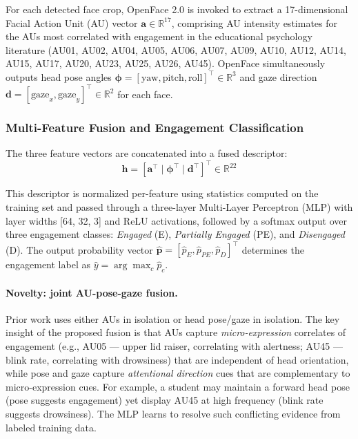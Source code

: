 \documentclass[preprint,12pt]{elsarticle}
\begin{document}
For each detected face crop, OpenFace 2.0 \cite{openface} is invoked to extract a 17-dimensional Facial Action Unit (AU) vector $\mathbf{a} \in \mathbb{R}^{17}$, comprising AU intensity estimates for the AUs most correlated with engagement in the educational psychology literature (AU01, AU02, AU04, AU05, AU06, AU07, AU09, AU10, AU12, AU14, AU15, AU17, AU20, AU23, AU25, AU26, AU45). OpenFace simultaneously outputs head pose angles $\boldsymbol{\phi} = [\text{yaw}, \text{pitch}, \text{roll}]^\top \in \mathbb{R}^3$ and gaze direction $\mathbf{d} = [\text{gaze}_x, \text{gaze}_y]^\top \in \mathbb{R}^2$ for each face.

\subsubsection{Multi-Feature Fusion and Engagement Classification}

The three feature vectors are concatenated into a fused descriptor:
\begin{equation}
\mathbf{h} = \left[\mathbf{a}^\top \;\Big|\; \boldsymbol{\phi}^\top \;\Big|\; \mathbf{d}^\top\right]^\top \in \mathbb{R}^{22}
\label{eq:fusion}
\end{equation}

This descriptor is normalized per-feature using statistics computed on the training set and passed through a three-layer Multi-Layer Perceptron (MLP) with layer widths [64, 32, 3] and ReLU activations, followed by a softmax output over three engagement classes: \textit{Engaged} (E), \textit{Partially Engaged} (PE), and \textit{Disengaged} (D). The output probability vector $\hat{\mathbf{p}} = [\hat{p}_E, \hat{p}_{PE}, \hat{p}_D]^\top$ determines the engagement label as $\hat{y} = \arg\max_c \hat{p}_c$.

\paragraph{Novelty: joint AU-pose-gaze fusion.}
Prior work uses either AUs in isolation or head pose/gaze in isolation. The key insight of the proposed fusion is that AUs capture \textit{micro-expression} correlates of engagement (e.g., AU05 --- upper lid raiser, correlating with alertness; AU45 --- blink rate, correlating with drowsiness) that are independent of head orientation, while pose and gaze capture \textit{attentional direction} cues that are complementary to micro-expression cues. For example, a student may maintain a forward head pose (pose suggests engagement) yet display AU45 at high frequency (blink rate suggests drowsiness). The MLP learns to resolve such conflicting evidence from labeled training data.
\end{document}
